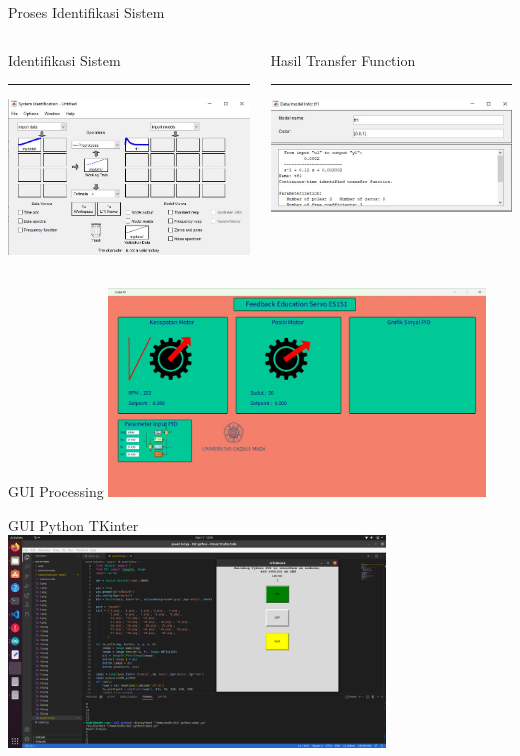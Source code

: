 \documentclass[10pt,xcolor={dvipsnames}]{beamer}
\begin{document}
\begin{frame}{Proses Identifikasi Sistem}
	\begin{columns}[T] %
		\begin{column}{0.48\textwidth}
			Identifikasi Sistem
			\color{black}\rule{\linewidth}{4pt}
			\includegraphics[width=7.5cm]{Hasil Matlab/prosesident.jpg}
		\end{column}%
		\hfill%
		\begin{column}{0.48\textwidth}
			Hasil Transfer Function
			\color{blue}\rule{\linewidth}{4pt}
			\begin{center}
				\includegraphics[width=7.5cm]{Hasil Matlab/hasiltf.jpg}
			\end{center}
		\end{column}
	\end{columns}
\end{frame}

\begin{frame}{GUI Processing}
	\centering
	\includegraphics[width=10cm]{Gambar Lain/guiprocessing.jpeg}
\end{frame}

\begin{frame}{GUI Python TKinter}
	\centering
	\includegraphics[width=10cm]{Gambar Lain/guitkinter.png}
\end{frame}
\end{document}
